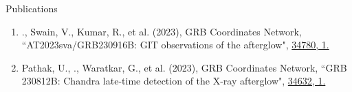 \begin{section}{Publications}
\begin{enumerate}
        \item \me., Swain, V., Kumar, R., et al. (2023), GRB Coordinates Network, {``AT2023sva/GRB230916B: GIT observations of the afterglow"}, \href{https://gcn.nasa.gov/circulars/34780}{34780, 1.}
        \vspace{-0.2em}
        
        \item Pathak, U., \me., Waratkar, G., et al. (2023), GRB Coordinates Network, {``GRB 230812B: Chandra late-time detection of the X-ray afterglow"}, \href{https://gcn.nasa.gov/circulars/34632}{34632, 1.}
    \end{enumerate}

\end{section}
